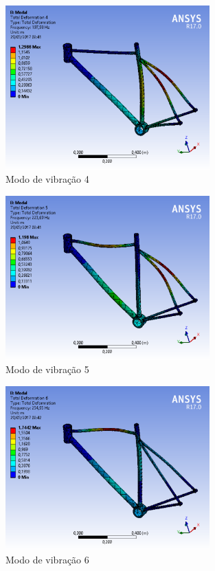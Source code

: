 		\graphicspath{{figuras/}}
			\begin{figure}[h!]
			\centering
			\includegraphics[width=0.7\textwidth]{modo_de_vibracao_4.png}
			\caption{Modo de vibração 4}
			\label{img:modo_de_vibracao4}
			\end{figure}	
			
		\graphicspath{{figuras/}}
			\begin{figure}[h!]
			\centering
			\includegraphics[width=0.7\textwidth]{modo_de_vibracao_5.png}
			\caption{Modo de vibração 5}
			\label{img:modo_de_vibracao5}
			\end{figure}	
		
		\graphicspath{{figuras/}}
			\begin{figure}[h!]
			\centering
			\includegraphics[width=0.7\textwidth]{modo_de_vibracao_6.png}
			\caption{Modo de vibração 6}
			\label{img:modo_de_vibracao 6}
			\end{figure}	

